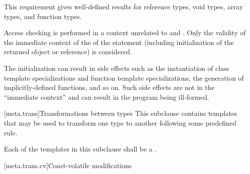 \begin{note}
This requirement gives well-defined results for reference types, void
types, array types, and function types.
\end{note}
Access checking is performed
in a context unrelated to  and . Only the validity of
the immediate context of the  of the  statement
(including initialization of the returned object or reference) is considered.
\begin{note}
The
initialization can result in side effects such as the
instantiation of class template specializations and function template
specializations, the generation of implicitly-defined functions, and so on. Such
side effects are not in the ``immediate context'' and can result in the program
being ill-formed.
\end{note}

[meta.trans]{Transformations between types}
\pnum
This subclause contains templates that may be used to transform one
type to another following some predefined rule.

\pnum
Each of the templates in this subclause shall be a
.

[meta.trans.cv]{Const-volatile modifications}

